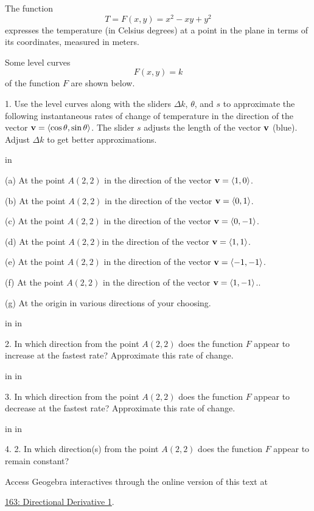 \documentclass{ximera}
\newcommand{\pskip}{\vskip 0.1 in}
\begin{document}
\begin{question}  \label{Qds54546bd}

The function 
\[
     T= F(x,y) = x^2 -xy +y^2
\]
expresses the temperature (in Celsius degrees) at a point in the plane in terms of its coordinates, measured in meters.

Some level curves 
\[
     F(x,y)=k
\]
of the function $F$ are shown below. 

1. Use the level curves along with the sliders $\Delta k$, $\theta$, and $s$ to approximate the following instantaneous rates of change of temperature in the direction of the vector ${\bf v} = \langle \cos\theta, \sin\theta \rangle$. The slider $s$ adjusts the length of the vector ${\bf v}$ (blue). Adjust $\Delta k$ to get better approximations.

\pskip

(a) At the point $A(2,2)$ in the direction of the vector ${\bf v} = \langle 1, 0 \rangle$.

(b)  At the point $A(2,2)$ in the direction of the vector ${\bf v} = \langle 0,1 \rangle$.

(c)  At the point $A(2,2)$ in the direction of the vector ${\bf v} = \langle 0, -1 \rangle$.

(d)  At the point $A(2,2)$in the direction of the vector ${\bf v} = \langle 1,1 \rangle$.

(e)  At the point $A(2,2)$ in the direction of the vector ${\bf v} = \langle -1,-1 \rangle$.

(f)  At the point $A(2,2)$ in the direction of the vector ${\bf v} = \langle 1,-1 \rangle$..

(g) At the origin in various directions of your choosing.

\pskip \pskip

2. In which direction from the point $A(2,2)$ does the function $F$ appear to increase at the fastest rate? Approximate this rate of change.

\pskip \pskip

3. In which direction from the point $A(2,2)$ does the function $F$ appear to decrease at the fastest rate? Approximate this rate of change.

\pskip \pskip

4. 2. In which direction(s) from the point $A(2,2)$ does the function $F$ appear to remain constant? 


 
\begin{onlineOnly}
    \begin{center}
\end{center}
\end{onlineOnly}

Access Geogebra interactives through the online version of this text at
 
\href{https://www.geogebra.org/classic/cfkfwfpk}{163: Directional Derivative 1}.



\end{question}
\end{document}
